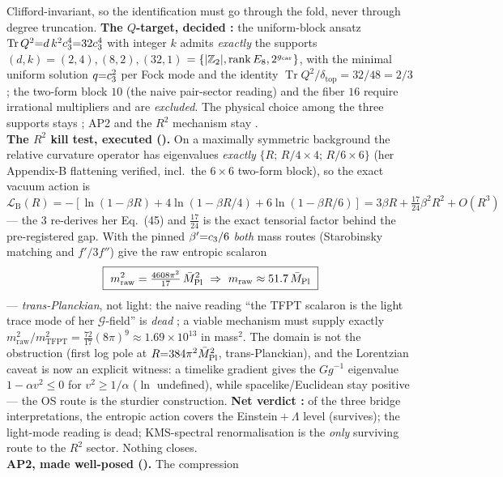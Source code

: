 \begin{keybox}
Clifford-invariant, so the identification must go through the fold, never through degree truncation.
\textbf{The $Q$-target, decided \mE:} the uniform-block ansatz $\operatorname{Tr}Q^2{=}d\,k^2c_3^4
{=}32c_3^4$ with integer $k$ admits \emph{exactly} the supports $(d,k){=}(2,4),(8,2),(32,1)$
$=\{|\mathbb Z_2|,\operatorname{rank}E_8,2^{g_{\mathrm{car}}}\}$, with the minimal uniform solution $q{=}c_3^2$ per
Fock mode and the identity $\operatorname{Tr}Q^2/\delta_{\mathrm{top}}{=}32/48{=}2/3$; the two-form
block $10$ (the naive pair-sector reading) and the fiber $16$ require irrational multipliers and are
\emph{excluded}. The physical choice among the three supports stays \mC; AP2 and the $R^2$ mechanism
stay \mO.
\smallskip\\
\noindent\textbf{The $R^2$ kill test, executed ().} On a
maximally symmetric background the relative curvature operator has eigenvalues \emph{exactly}
$\{R;\,R/4\times4;\,R/6\times6\}$ (her Appendix-B flattening verified, incl.\ the $6{\times}6$
two-form block), so the exact vacuum action is
$\mathcal L_{\mathrm B}(R)=-[\ln(1{-}\beta R)+4\ln(1{-}\beta R/4)+6\ln(1{-}\beta R/6)]
=3\beta R+\tfrac{17}{24}\beta^2R^2+O(R^3)$ --- the $3$ re-derives her Eq.~(45) and
$\tfrac{17}{24}$ is the exact tensorial factor behind the pre-registered gap. With the pinned
$\beta'{=}c_3/6$ \emph{both} mass routes (Starobinsky matching and $f'/3f''$) give the raw
entropic scalaron
\[
  \boxed{\ m_{\mathrm{raw}}^2=\tfrac{4608\pi^2}{17}\,\Mpl^2\ \Rightarrow\ m_{\mathrm{raw}}
  \approx51.7\,\Mpl\ }
\]
--- \emph{trans-Planckian}, not light: the naive reading ``the TFPT scalaron is the light trace mode
of her $\mathcal G$-field'' is \emph{dead} \mE; a viable mechanism must supply exactly
$m_{\mathrm{raw}}^2/m_{\mathrm{TFPT}}^2=\tfrac{72}{17}(8\pi)^9\approx1.69\times10^{13}$ in mass$^2$.
The domain is not the obstruction (first log pole at $R{=}384\pi^2\bar M_{\mathrm{Pl}}^2$, trans-Planckian), and the
Lorentzian caveat is now an explicit witness: a timelike gradient gives the $Gg^{-1}$ eigenvalue
$1-\alpha v^2\le0$ for $v^2\ge1/\alpha$ ($\ln$ undefined), while spacelike/Euclidean stay positive
--- the OS route is the sturdier construction. \textbf{Net verdict \mC:} of the three bridge
interpretations, the entropic action covers the Einstein${}+\Lambda$ level (survives); the light-mode
reading is dead; KMS-spectral renormalisation is the \emph{only} surviving route to the $R^2$
sector. Nothing closes.
\smallskip\\
\noindent\textbf{AP2, made well-posed ().} The compression

\end{keybox}
